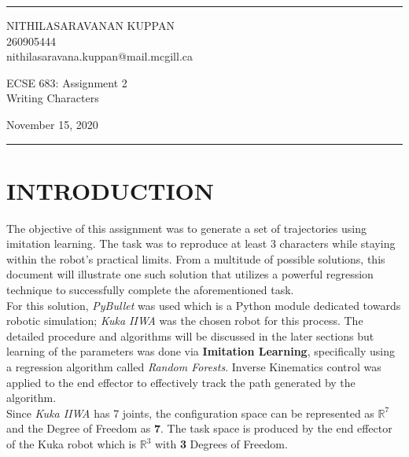\documentclass[a4paper]{article}
\begin{document}

\fancyhead[C]{}
\hrule \medskip %
\begin{minipage}{0.295\textwidth} 
\raggedright
\footnotesize
NITHILASARAVANAN KUPPAN \hfill\\   
260905444\hfill\\
nithilasaravana.kuppan@mail.mcgill.ca
\end{minipage}
\begin{minipage}{0.4\textwidth} 
\centering 
\large 
ECSE 683: Assignment 2\\ 
\normalsize 
Writing Characters\\ 
\end{minipage}
\begin{minipage}{0.295\textwidth} 
\raggedleft
{\text November 15, 2020}\hfill\\
\end{minipage}
\medskip\hrule 
\bigskip


\section{INTRODUCTION}
The objective of this assignment was to generate a set of trajectories using imitation learning. The task was to reproduce at least 3 characters while staying within the robot's practical limits. From a multitude of possible solutions, this document will illustrate one such solution that utilizes a powerful regression technique to successfully complete the aforementioned task.\\

For this solution, {\it PyBullet} was used which is a Python module dedicated towards robotic simulation; {\it Kuka IIWA} was the chosen robot for this process. The detailed procedure and algorithms will be discussed in the later sections but learning of the parameters was done via \textbf{Imitation Learning}, specifically using a regression algorithm called{ \it Random Forests}. Inverse Kinematics control was applied to the end effector to effectively track the path generated by the algorithm. \\

Since {\it Kuka IIWA} has 7 joints, the configuration space can be represented as \textbf{$\mathbb{R}^7$} and the Degree of Freedom as \textbf{7}. The task space is produced by the end effector of the Kuka robot which is \textbf{$\mathbb{R}^3$} with \textbf{3} Degrees of Freedom.\\
\end{document}

